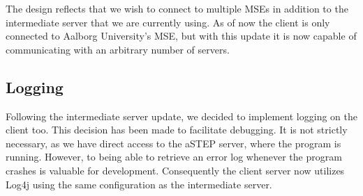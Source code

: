 The design reflects that we wish to connect to multiple MSEs in addition to the intermediate server that we are currently using. As of now the client is only connected to Aalborg University's MSE, but with this update it is now capable of communicating with an arbitrary number of servers.

\subsection*{Logging}
Following the intermediate server update, we decided to implement logging on the client too. This decision has been made to facilitate debugging. It is not strictly necessary, as we have direct access to the aSTEP server, where the program is running. However, to being able to retrieve an error log whenever the program crashes is valuable for development. Consequently the client server now utilizes Log4j \cite{log4j} using the same configuration as the intermediate server.